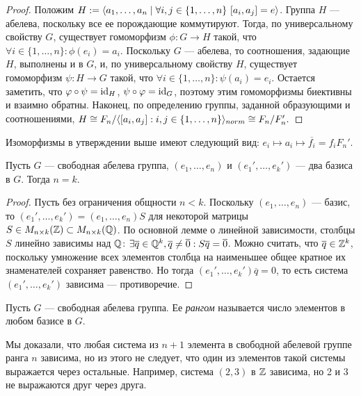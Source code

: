 \begin{proof}
	Положим $H := \langle a_1, \ldots, a_n \mid \forall i, j \in \{1, \ldots, n\}\ [a_i, a_j] = e \rangle$. Группа $H$ --- абелева, поскольку все ее порождающие коммутируют. Тогда, по универсальному свойству $G$, существует гомоморфизм $\phi: G \to H$ такой, что $\forall i \in \{1, \ldots, n\}: \phi(e_i) = a_i$. Поскольку $G$ --- абелева, то соотношения, задающие $H$, выполнены и в $G$, и, по универсальному свойству $H$, существует гомоморфизм $\psi: H \to G$ такой, что $\forall i \in \{1, \ldots, n\}: \psi(a_i) = e_i$. Остается заметить, что $\varphi \circ \psi = \operatorname{id}_H$, $\psi \circ \varphi = \operatorname{id}_G$, поэтому этим гомоморфизмы биективны и взаимно обратны. Наконец, по определению группы, заданной образующими и соотношениями, $H \cong F_n / \langle [a_i, a_j] : i, j \in \{1, \ldots, n\}\rangle_{norm} \cong F_n / F_n'.$
\end{proof}

\begin{note}
	Изоморфизмы в утверждении выше имеют следующий вид: $e_i \mapsto a_i \mapsto \overline{f_i} = f_iF_n'$.
\end{note}

\begin{theorem}
	Пусть $G$ --- свободная абелева группа, $(e_1, \ldots, e_n)$ и $(e_1', \ldots, e_k')$ --- два базиса в $G$. Тогда $n = k$.
\end{theorem}

\begin{proof}
	Пусть без ограничения общности $n < k$. Поскольку $(e_1, \ldots, e_n)$ --- базис, то $(e_1', \ldots, e_k') = (e_1, \ldots, e_n)S$ для некоторой матрицы $S \in M_{n \times k}(\mathbb{Z}) \subset M_{n \times k}(\mathbb{Q})$. По основной лемме о линейной зависимости, столбцы $S$ линейно зависимы над $\mathbb{Q}$: $\exists \overline{q} \in \mathbb{Q}^k, \overline{q} \ne \overline{0}: S\overline{q} = \overline{0}$. Можно считать, что $\overline{q} \in \mathbb{Z}^k$, поскольку умножение всех элементов столбца на наименьшее общее кратное их знаменателей сохраняет равенство. Но тогда $(e_1', \ldots, e_k')\overline{q} = 0$, то есть система $(e_1', \ldots, e_k')$ зависима --- противоречие.
\end{proof}

\begin{definition}
	Пусть $G$ --- свободная абелева группа. Ее \textit{рангом} называется число элементов в любом базисе в $G$.
\end{definition}

\begin{note}
	Мы доказали, что любая система из $n+1$ элемента в свободной абелевой группе ранга $n$ зависима, но из этого не следует, что один из элементов такой системы выражается через остальные. Например, система $(2, 3)$ в $\mathbb{Z}$ зависима, но 2 и 3 не выражаются друг через друга.
\end{note}

